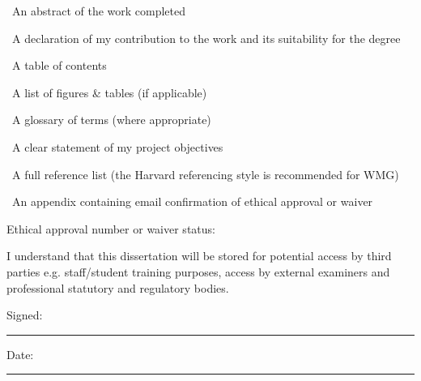\begin{center}
\begin{minipage}{0.78\textwidth}
\setlength{\parskip}{1pt}
\TickBox\ An abstract of the work completed\par
\TickBox\ A declaration of my contribution to the work and its suitability for the degree\par
\TickBox\ A table of contents\par
\TickBox\ A list of figures \& tables (if applicable)\par
\TickBox\ A glossary of terms (where appropriate)\par
\TickBox\ A clear statement of my project objectives\par
\TickBox\ A full reference list (the Harvard referencing style is recommended for WMG)\par
\EmptyBox\ An appendix containing email confirmation of ethical approval or waiver\par
\end{minipage}
\end{center}

\vspace{1mm}
\noindent Ethical approval number or waiver status:\quad {}\par
\vspace{3mm}

\noindent I understand that this dissertation will be stored for potential access by third parties e.g. staff/student training purposes, access by external examiners and professional statutory and regulatory bodies.\par
\vfill

\begin{center}
Signed: \rule{0.32\textwidth}{0.4pt}\hspace{10mm}Date: \rule{0.20\textwidth}{0.4pt}
\end{center}

\clearpage
\restoregeometry
